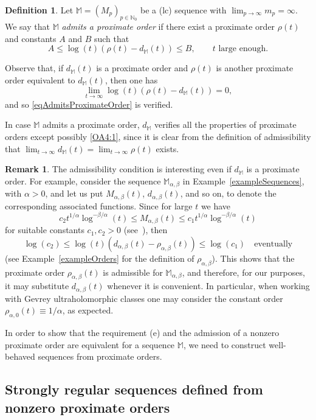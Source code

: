 \documentclass[11pt,a4paper]{article}
\theoremstyle{definition}
\newtheorem{defi}[theo]{Definition}
\newtheorem{rema}[theo]{Remark}
\def\oo{\infty}
\def\a{\alpha}
\def\b{\beta}
\def\ro{\rho}
\def\N{\mathbb{N}}
\def\M{\mathbb{M}}
\begin{document}
\begin{defi}\label{def.admit.p.o}
Let $\M=(M_p)_{p\in\N_0}$ be a (lc) sequence with $\lim_{p\to\infty} m_p=\infty$. We say that $\M$ \textit{admits a proximate order} if there exist a proximate order $\ro(t)$
 and constants $A$ and $B$ such that
\begin{equation}\label{eqAdmitsProximateOrder}
A\leq \log(t)(\ro(t)-d_{\M}(t)) \leq B, \qquad t\textrm{ large enough}.
\end{equation}
\end{defi}


Observe that, if $d_{\M}(t)$ is a proximate order and $\rho(t)$ is another proximate order equivalent to $d_{\M}(t)$, then one has
$$
\lim_{t\to\infty}\log(t)(\ro(t)-d_{\M}(t))=0,
$$
and so \eqref{eqAdmitsProximateOrder} is verified.

In case $\M$ admits a proximate order, $d_{\M}$ verifies all the properties of proximate orders except possibly \eqref{OA4:1}, since it is clear from the definition of admissibility that
 $\lim_{t\to\oo}d_{\M}(t)=\lim_{t\to\oo}\ro(t)$ exists.


\begin{rema}\label{remaEasyProxOrder}
The admissibility condition is interesting even if  $d_{\M}$ is a proximate order. For example, consider the sequence $\M_{\a,\b}$ in Example~\ref{exampleSequences}, with $\a>0$, and let us put $M_{\a,\b}(t)$, $d_{\a,\b}(t)$, and so on, to denote the corresponding associated functions. Since for large $t$ we have
$$
c_2t^{1/\a}\log^{-\b/\a}(t)\le M_{\a,\b}(t)\le c_1t^{1/\a}\log^{-\b/\a}(t)
$$
for suitable constants $c_1,c_2>0$ (see~\cite[Example\ 1.2.2]{thilliez2}), then $$\log(c_2)\le\log(t)(d_{\a,\b}(t)-\ro_{\a,\b}(t))\le\log(c_1) \quad\textrm{eventually}
 $$
(see Example~\ref{exampleOrders} for the definition of $\ro_{\a,\b}$). This shows that the proximate order $\ro_{\a,\b}(t)$ is admissible for $\M_{\a,\b}$, and therefore, for our purposes, it may substitute $d_{\a,\b}(t)$ whenever it is convenient. In particular, when working with Gevrey ultraholomorphic classes one may consider the constant order $\ro_{\a,0}(t)\equiv 1/\a$, as expected.
\end{rema}

In order to show that the requirement (e) and the admission of a nonzero proximate order are equivalent for a sequence $\M$, we need to construct well-behaved sequences from proximate
orders.

\subsection{Strongly regular sequences defined from nonzero proximate orders}
\end{document}
